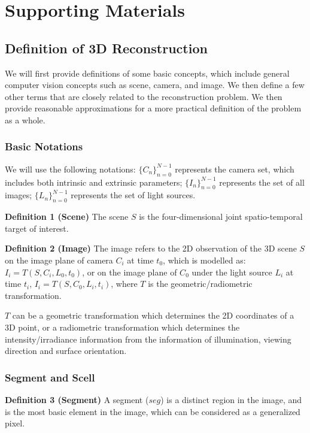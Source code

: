
\chapter{Supporting Materials}

\section{Definition of 3D Reconstruction}
\label{sec:3DRecon_Def}
We will first provide definitions of some basic concepts, which include general computer vision concepts such as scene, camera, and image. We then define a few other terms that are closely related to the reconstruction problem. We then provide reasonable approximations for a more practical definition of the problem as a whole.

\subsection{Basic Notations}
We will use the following notations: $\{C_n\}_{n=0}^{N-1}$ represents the camera set, which includes both intrinsic and extrinsic parameters; $\{I_n\}_{n=0}^{N-1}$ represents the set of all images; $\{L_n\}_{n=0}^{N-1}$ represents the set of light sources.

\noindent\textbf{Definition 1 (Scene)} The scene $S$ is the four-dimensional joint spatio-temporal target of interest.

\noindent\textbf{Definition 2 (Image)} The image refers to the 2D observation of the 3D scene $S$ on the image plane of camera $C_i$ at time $t_0$, which is modelled as: $I_i = T(S, C_i, L_0, t_0)$, or on the image plane of $C_0$  under the light source $L_i$ at time $t_i$, $I_i= T(S, C_0, L_i, t_i)$, where $T$ is the geometric/radiometric transformation.

$T$ can be a geometric transformation which determines the 2D coordinates of a 3D point, or a radiometric transformation which determines the intensity/irradiance information from the information of illumination, viewing direction and surface orientation.

\subsection{Segment and Scell}
\noindent\textbf{Definition 3 (Segment)} A segment ($seg$) is a distinct region in the image, and is the most basic element in the image, which can be considered as a generalized pixel. 

